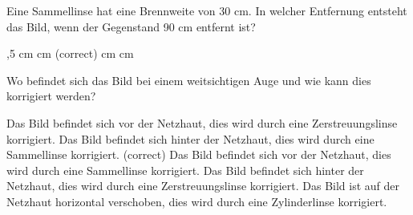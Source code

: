 \documentclass[11pt]{exam}
\begin{document}
\begin{questions}
\vspace{3mm}\question Eine Sammellinse hat eine Brennweite von 30 cm. In welcher Entfernung entsteht das Bild, wenn der Gegenstand 90 cm entfernt ist?

\begin{choices}
	,5 cm
	 cm
	\choice 45cm (correct)
	 cm
	 cm
\end{choices}

\vspace{3mm}\question Wo befindet sich das Bild bei einem weitsichtigen Auge und wie kann dies korrigiert werden?

\begin{choices}
	\choice Das Bild befindet sich vor der Netzhaut, dies wird durch eine Zerstreuungslinse korrigiert.
	\choice Das Bild befindet sich hinter der Netzhaut, dies wird durch eine Sammellinse korrigiert. (correct)
	\choice Das Bild befindet sich vor der Netzhaut, dies wird durch eine Sammellinse korrigiert.
	\choice Das Bild befindet sich hinter der Netzhaut, dies wird durch eine Zerstreuungslinse korrigiert.
	\choice Das Bild ist auf der Netzhaut horizontal verschoben, dies wird durch eine Zylinderlinse korrigiert.
\end{choices}

\vspace{3mm}\end{questions}
\end{document}
